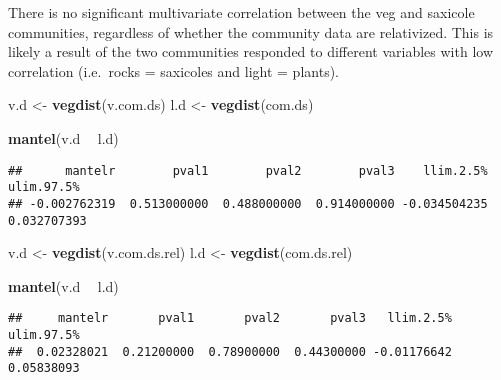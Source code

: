 \documentclass[]{article}
\newenvironment{Shaded}{\begin{snugshade}}{\end{snugshade}}
\newcommand{\KeywordTok}[1]{\textcolor[rgb]{0.13,0.29,0.53}{\textbf{#1}}}
\newcommand{\StringTok}[1]{\textcolor[rgb]{0.31,0.60,0.02}{#1}}
\newcommand{\OperatorTok}[1]{\textcolor[rgb]{0.81,0.36,0.00}{\textbf{#1}}}
\newcommand{\NormalTok}[1]{#1}
\begin{document}
There is no significant multivariate correlation between the veg and
saxicole communities, regardless of whether the community data are
relativized. This is likely a result of the two communities responded to
different variables with low correlation (i.e.~rocks = saxicoles and
light = plants).

\begin{Shaded}
\begin{Highlighting}[]
\NormalTok{v.d <-}\StringTok{ }\KeywordTok{vegdist}\NormalTok{(v.com.ds)}
\NormalTok{l.d <-}\StringTok{ }\KeywordTok{vegdist}\NormalTok{(com.ds)}

\KeywordTok{mantel}\NormalTok{(v.d }\OperatorTok{~}\StringTok{ }\NormalTok{l.d)}
\end{Highlighting}
\end{Shaded}

\begin{verbatim}
##      mantelr        pval1        pval2        pval3    llim.2.5%   ulim.97.5% 
## -0.002762319  0.513000000  0.488000000  0.914000000 -0.034504235  0.032707393
\end{verbatim}

\begin{Shaded}
\begin{Highlighting}[]
\NormalTok{v.d <-}\StringTok{ }\KeywordTok{vegdist}\NormalTok{(v.com.ds.rel)}
\NormalTok{l.d <-}\StringTok{ }\KeywordTok{vegdist}\NormalTok{(com.ds.rel)}

\KeywordTok{mantel}\NormalTok{(v.d }\OperatorTok{~}\StringTok{ }\NormalTok{l.d)}
\end{Highlighting}
\end{Shaded}

\begin{verbatim}
##     mantelr       pval1       pval2       pval3   llim.2.5%  ulim.97.5% 
##  0.02328021  0.21200000  0.78900000  0.44300000 -0.01176642  0.05838093
\end{verbatim}
\end{document}
